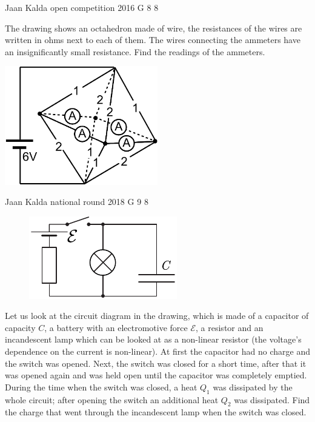 \documentclass[11pt]{article}
\begin{document}
{Jaan Kalda} %
{open competition} %
{2016} %
{G 8} %
{8} %
{

\ifEngStatement
The drawing shows an octahedron made of wire, the resistances of the wires are written in ohms next to each of them. The wires connecting the ammeters have an insignificantly small resistance. Find the readings of the ammeters.
\begin{center}
\includegraphics[width=0.5\textwidth]{2016-lahg-08-ampermeeterjoonis}
\end{center}
\fi
}

{Jaan Kalda} %
{national round} %
{2018} %
{G 9} %
{8} %
{

\ifEngStatement
\begin{figure}
\vspace{-10pt}
\begin{center}
\includegraphics[width=\linewidth]{2018-v3g-09-LC-Q}
\par\end{center} 
\end{figure}
Let us look at the circuit diagram in the drawing, which is made of a capacitor of capacity $C$, a battery with an electromotive force $\mathcal{E}$, a resistor and an incandescent lamp which can be looked at as a non-linear resistor (the voltage’s dependence on the current is non-linear). At first the capacitor had no charge and the switch was opened. Next, the switch was closed for a short time, after that it was opened again and was held open until the capacitor was completely emptied. During the time when the switch was closed, a heat $Q_1$ was dissipated by the whole circuit; after opening the switch an additional heat $Q_2$ was dissipated. Find the charge that went through the incandescent lamp when the switch was closed.
\fi
}
\end{document}
